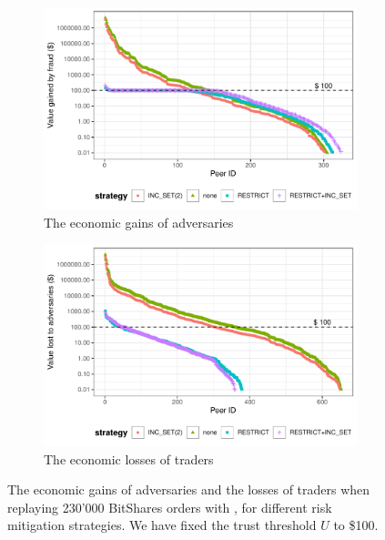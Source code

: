 \begin{figure}[t]
	\centering
	\begin{subfigure}[t]{.7\textwidth}
		\centering
		\captionsetup{width=.9\linewidth}
		\includegraphics[width=.95\linewidth]{xchange/assets/experiments/fraud/gained_per_user}
		\caption{The economic gains of adversaries}
		\label{fig:fraud_experiment_gained}
	\end{subfigure}
	\begin{subfigure}[t]{.7\textwidth}
		\centering
		\captionsetup{width=.9\linewidth}
		\includegraphics[width=.95\linewidth]{xchange/assets/experiments/fraud/losses_per_user}
		\caption{The economic losses of traders}
		\label{fig:fraud_experiment_losses}
	\end{subfigure}%
	\caption{The economic gains of adversaries and the losses of traders when replaying 230'000 BitShares orders with \ModelName{}, for different risk mitigation strategies. We have fixed the trust threshold $ U $ to \$100.}
	\label{fig:fraud_experiments}
\end{figure}

